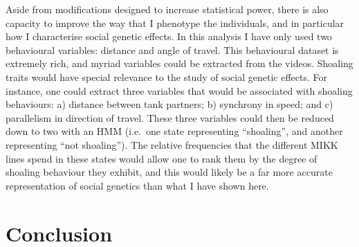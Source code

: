 \documentclass[
]{book}
\begin{document}
Aside from modifications designed to increase statistical power, there is also capacity to improve the way that I phenotype the individuals, and in particular how I characterise social genetic effects. In this analysis I have only used two behavioural variables: distance and angle of travel. This behavioural dataset is extremely rich, and myriad variables could be extracted from the videos. Shoaling traits would have special relevance to the study of social genetic effects. For instance, one could extract three variables that would be associated with shoaling behaviours: a) distance between tank partners; b) synchrony in speed; and c) parallelism in direction of travel. These three variables could then be reduced down to two with an HMM (i.e.~one state representing ``shoaling'', and another representing ``not shoaling''). The relative frequencies that the different MIKK lines spend in these states would allow one to rank them by the degree of shoaling behaviour they exhibit, and this would likely be a far more accurate representation of social genetics than what I have shown here.

\hypertarget{conclusion}{%
\chapter*{Conclusion}\label{conclusion}}
\end{document}
